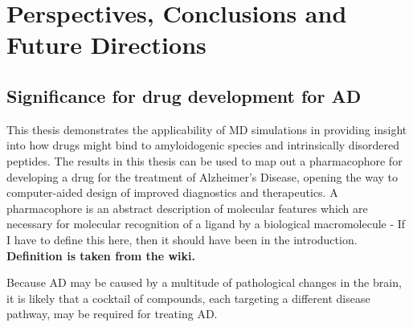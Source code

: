 \chapter{Perspectives, Conclusions and Future Directions}



\section{Significance for drug development for AD}
This thesis demonstrates the applicability of MD simulations in providing insight into how drugs might bind to amyloidogenic species and intrinsically disordered peptides.  The results in this thesis can be used to map out a pharmacophore for developing a drug for the treatment of Alzheimer's Disease, opening the way to computer-aided design of improved diagnostics and therapeutics. A pharmacophore is an abstract description of molecular features which are necessary for molecular recognition of a ligand by a biological macromolecule - If I have to define this here, then it should have been in the introduction. \textbf{Definition is taken from the wiki.}


Because AD may be caused by a multitude of pathological changes in the brain, it is likely that a cocktail of compounds, each targeting a different disease pathway, may be required for treating AD. %

